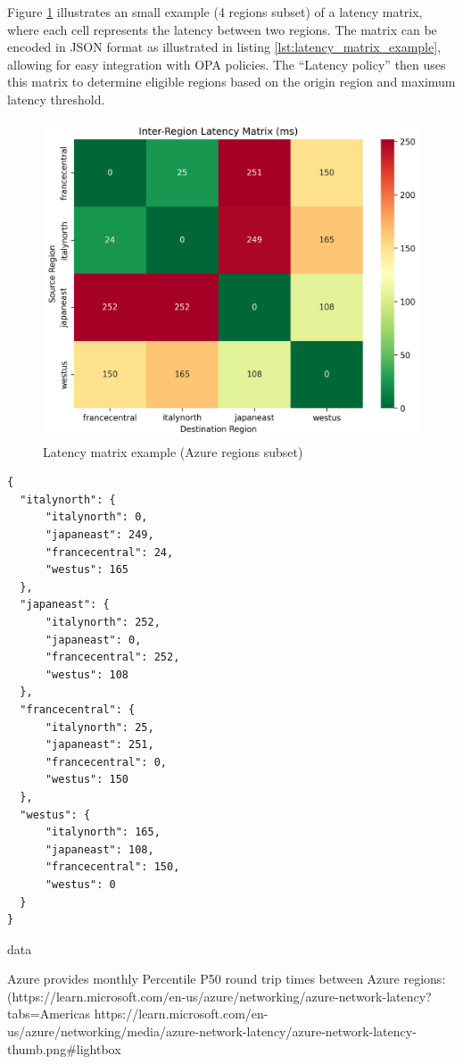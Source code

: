Figure \ref{fig:latency_matrix} illustrates an small example (4 regions subset) of a latency matrix, where each cell represents the latency between two regions. The matrix can be encoded in JSON format as illustrated in listing \ref{lst:latency_matrix_example}, allowing for easy integration with OPA policies. The ``Latency policy'' then uses this matrix to determine eligible regions based on the origin region and maximum latency threshold.

\begin{figure}[H]
  \centering
  \includegraphics[width=0.75\linewidth]{images/latency_heatmap.png}
  \caption{Latency matrix example (Azure regions subset)}
  \label{fig:latency_matrix}
\end{figure}


\lstset{style=jsonstyle}
\begin{lstlisting}[caption={Latancy matrix example encoded in JSON format}, label={lst:latency_matrix_example}]
{
  "italynorth": {
      "italynorth": 0,
      "japaneast": 249,
      "francecentral": 24,
      "westus": 165
  },
  "japaneast": {
      "italynorth": 252,
      "japaneast": 0,
      "francecentral": 252,
      "westus": 108
  },
  "francecentral": {
      "italynorth": 25,
      "japaneast": 251,
      "francecentral": 0,
      "westus": 150
  },
  "westus": {
      "italynorth": 165,
      "japaneast": 108,
      "francecentral": 150,
      "westus": 0
  }
}

\end{lstlisting}


data

Azure provides monthly Percentile P50 round trip times between Azure regions:
(https://learn.microsoft.com/en-us/azure/networking/azure-network-latency?tabs=Americas%
https://learn.microsoft.com/en-us/azure/networking/media/azure-network-latency/azure-network-latency-thumb.png#lightbox 

